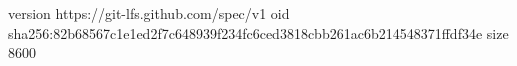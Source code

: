 version https://git-lfs.github.com/spec/v1
oid sha256:82b68567c1e1ed2f7c648939f234fc6ced3818cbb261ac6b214548371ffdf34e
size 8600
